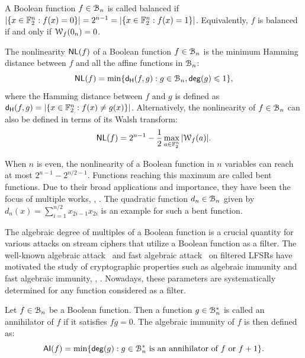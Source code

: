\documentclass{llncs}
\begin{document}
\begin{definition}[Balancedness]
A Boolean function $f\in\mathcal{B}_n$ is called balanced if $|\{x \in \mathbb{F}_2^n : f(x)=0\}|=2^{n-1}=|\{x \in \mathbb{F}_2^n : f(x)=1\}|$. 
Equivalently, $f$ is balanced if and only if $\mathcal W_{f}(0_n)=0$.
\end{definition}

\begin{definition}%
	\label{def:nl}
	The nonlinearity $\mathsf{NL}(f)$ of a Boolean function $f\in \mathcal{B}_n$ is the minimum Hamming distance between $f$ and all the affine functions in $\mathcal{B}_n$:
	\[
		\mathsf{NL}(f) = \min\{ \mathsf{d_H}(f,g):g\in\mathcal{B}_n,\mathsf{deg}(g)\leqslant 1\},
	\]
	where the Hamming distance between $f$ and $g$ is defined as $\mathsf{d_H}(f,g)=|\{x\in\mathbb{F}_2^n:f(x)\neq g(x)\}|$. Alternatively, the nonlinearity of $f\in\mathcal{B}_n$ can also be defined in terms of its Walsh transform:
	\[
		\mathsf{NL}(f) = 2^{n-1}- \frac{1}{2} \max_{a\in \mathbb{F}_2^n}{|\mathcal W_{f}(a)|}.
	\]
\end{definition}

When $n$ is even, the nonlinearity of a Boolean function in $n$ variables can reach at most $2^{n-1}-2^{n/2 -1}$. Functions reaching this maximum are called bent functions. Due to their broad applications and importance, they have been the focus of multiple works, \eg, \cite{Rothaus76,FSE:Dobbertin95,DBLP:conf/itw/BudaghyanCH11,Tokareva15,Mesnager16}. 
The quadratic function $d_n\in\mathcal{B}_n$ given by $d_n(x)=\sum_{i=1}^{n/2}x_{2i-1}x_{2i}$ is an example for such a bent function.

\bigskip

The algebraic degree of multiples of a Boolean function is a crucial quantity for various attacks on stream ciphers that utilize a Boolean function as a filter. 
The well-known algebraic attack~\cite{EC:CouMei03} and fast algebraic attack~\cite{C:Courtois03} on filtered \textsf{LFSR}s have motivated the study of cryptographic properties such as algebraic immunity and fast algebraic immunity, \eg, \cite{FSE:Armknecht04,C:HawRos04,ISC:JiaZhaWan13}. Nowadays, these parameters are systematically determined for any function considered as a filter.

\begin{definition} \label{def:ai}
	Let $f\in\mathcal{B}_n$ be a Boolean function. Then a function $g\in\mathcal{B}_n^*$ is called an annihilator of $f$ if it satisfies $fg=0$. The algebraic immunity of $f$ is then defined as:
	\[ \mathsf{AI}(f) = \min\{ \mathsf{deg}(g):\text{$g\in\mathcal{B}_n^*$ is an annihilator of $f$ or $f+1$}\}.\]
\end{definition}
\end{document}

